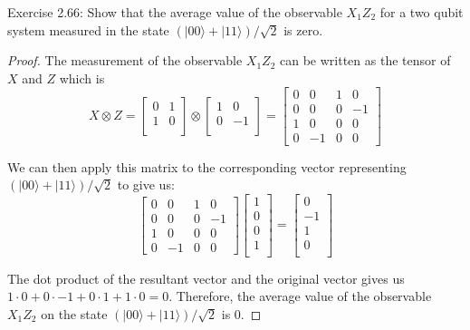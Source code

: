 \begin{problem}
	Exercise 2.66: Show that the average value of the observable $X_1 Z_2$ for a two qubit system measured in the state $(|00\rangle+|11\rangle) / \sqrt{2}$ is zero.
\end{problem}
\begin{proof}
	The measurement of the observable \(X_1 Z_2\) can be written as the tensor of \(X\) and \(Z\) which is
\[ X \otimes Z = \begin{bmatrix} 0 & 1 \\ 1 & 0 \\ \end{bmatrix} \otimes \begin{bmatrix} 1 & 0 \\ 0 & -1 \\ \end{bmatrix} = \begin{bmatrix} 0 & 0 & 1 & 0 \\ 0 & 0 & 0 & -1 \\ 1 & 0 & 0 & 0 \\ 0 & -1 & 0 & 0 \end{bmatrix} \]

We can then apply this matrix to the corresponding vector representing \((|00\rangle + |11\rangle)/\sqrt{2}\) to give us:
\[ \begin{bmatrix} 0 & 0 & 1 & 0 \\ 0 & 0 & 0 & -1 \\ 1 & 0 & 0 & 0 \\ 0 & -1 & 0 & 0 \end{bmatrix} \begin{bmatrix} 1 \\ 0 \\ 0 \\ 1 \\ \end{bmatrix} = \begin{bmatrix} 0 \\ -1 \\ 1 \\ 0 \\ \end{bmatrix} \]

The dot product of the resultant vector and the original vector gives us \(1 \cdot 0 + 0 \cdot -1 + 0 \cdot 1 + 1 \cdot 0 = 0\). Therefore, the average value of the observable \(X_1 Z_2\) on the state \((|00\rangle + |11\rangle)/\sqrt{2}\) is 0.
\end{proof}

